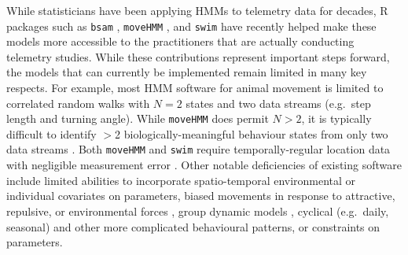 \documentclass[12pt]{article}\usepackage[]{graphicx}\usepackage[]{color}
\begin{document}
While statisticians have been applying HMMs to telemetry data for decades, R \citep{RCoreTeam2017} packages such as \verb|bsam| \citep{JonsenEtAl2005}, \verb|moveHMM| \citep{MichelotEtAl2016}, and \verb|swim| \citep{WhoriskeyEtAl2017} have recently helped make these models more accessible to the practitioners that are actually conducting telemetry studies. While these contributions represent important steps %
forward, the models that can currently be implemented remain limited in many key respects. For example, most HMM software for animal movement is limited to correlated random walks with $N=2$ states and two data streams (e.g.\ step length and turning angle). While \verb|moveHMM| does permit $N>2$, it is typically difficult to identify $>$2 biologically-meaningful behaviour states from only two data streams \citep[e.g.][]{MoralesEtAl2004,BeyerEtAl2013,McClintockEtAl2014b}. Both \verb|moveHMM| and \verb|swim| require temporally-regular location data with negligible measurement error%
. Other notable deficiencies of existing software include limited abilities to incorporate spatio-temporal environmental or individual covariates on parameters, biased movements in response to attractive, repulsive, or environmental forces \citep[e.g.][]{McClintockEtAl2012}, group dynamic models \citep{LangrockEtAl2014}, cyclical (e.g.\ daily, seasonal) and other more complicated behavioural patterns, or constraints on parameters. %
\end{document}

